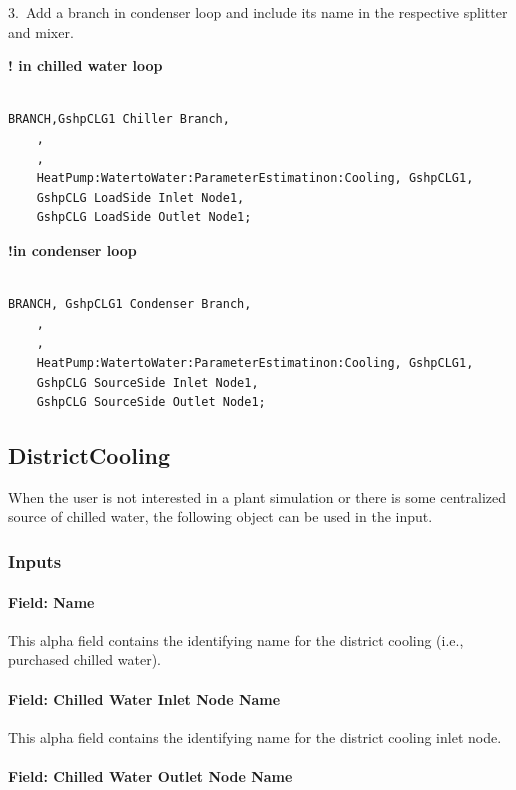 3.~Add a branch in condenser loop and include its name in the respective splitter and mixer.

\textbf{! in chilled water loop}

\begin{lstlisting}

BRANCH,GshpCLG1 Chiller Branch,
    ,
    ,
    HeatPump:WatertoWater:ParameterEstimatinon:Cooling, GshpCLG1,
    GshpCLG LoadSide Inlet Node1,
    GshpCLG LoadSide Outlet Node1;
\end{lstlisting}

\textbf{!in condenser loop}

\begin{lstlisting}

BRANCH, GshpCLG1 Condenser Branch,
    ,
    ,
    HeatPump:WatertoWater:ParameterEstimatinon:Cooling, GshpCLG1,
    GshpCLG SourceSide Inlet Node1,
    GshpCLG SourceSide Outlet Node1;
\end{lstlisting}

\subsection{DistrictCooling}\label{districtcooling}

When the user is not interested in a plant simulation or there is some centralized source of chilled water, the following object can be used in the input.

\subsubsection{Inputs}\label{inputs-16-008}

\paragraph{Field: Name}\label{field-name-15-006}

This alpha field contains the identifying name for the district cooling (i.e., purchased chilled water).

\paragraph{Field: Chilled Water Inlet Node Name}\label{field-chilled-water-inlet-node-name-9}

This alpha field contains the identifying name for the district cooling inlet node.

\paragraph{Field: Chilled Water Outlet Node Name}\label{field-chilled-water-outlet-node-name-10}


